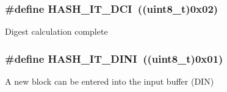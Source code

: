\subsubsection[{H\+A\+S\+H\+\_\+\+I\+T\+\_\+\+D\+C\+I}]{\setlength{\rightskip}{0pt plus 5cm}\#define H\+A\+S\+H\+\_\+\+I\+T\+\_\+\+D\+C\+I~((uint8\+\_\+t)0x02)}\label{group___h_a_s_h__interrupts__definition_gab5285b1618e3fac906d7502261d9bb38}
Digest calculation complete \hypertarget{group___h_a_s_h__interrupts__definition_ga0df296dbab5028378cc21ad733eb5675}{}
\subsubsection[{H\+A\+S\+H\+\_\+\+I\+T\+\_\+\+D\+I\+N\+I}]{\setlength{\rightskip}{0pt plus 5cm}\#define H\+A\+S\+H\+\_\+\+I\+T\+\_\+\+D\+I\+N\+I~((uint8\+\_\+t)0x01)}\label{group___h_a_s_h__interrupts__definition_ga0df296dbab5028378cc21ad733eb5675}
A new block can be entered into the input buffer (D\+I\+N) 